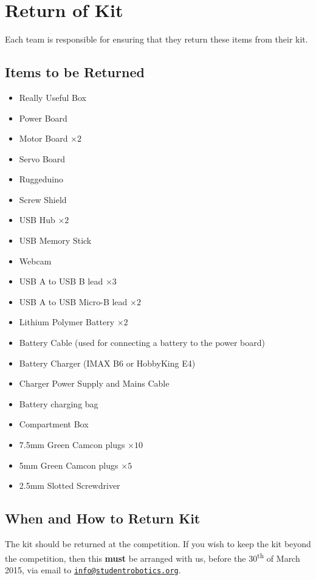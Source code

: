 \section {Return of Kit}
\label{sec:kit-return}

Each team is responsible for ensuring that they return these items from their kit.

\subsection {Items to be Returned}

\begin{itemize}
 \setlength{\itemsep}{0.3em}
 \item Really Useful Box

 \item Power Board
 \item Motor Board $\times 2$
 \item Servo Board
 \item Ruggeduino
 \item Screw Shield

 \item USB Hub $\times 2$
 \item USB Memory Stick
 \item Webcam
 \item USB A to USB B lead $\times 3$
 \item USB A to USB Micro-B lead $\times 2$

 \item Lithium Polymer Battery $\times 2$
 \item Battery Cable (used for connecting a battery to the power board)
 \item Battery Charger (IMAX B6 or HobbyKing E4)
 \item Charger Power Supply and Mains Cable
 \item Battery charging bag

 \item Compartment Box
 \item 7.5mm Green Camcon plugs $\times 10$
 \item 5mm Green Camcon plugs $\times 5$
 \item 2.5mm Slotted Screwdriver
\end{itemize}

\subsection {When and How to Return Kit}

The kit should be returned at the competition.
If you wish to keep the kit beyond the competition, then this \textbf{must} be arranged with us,
 before the 30\textsuperscript{th} of March 2015, via email to \href{mailto:info@studentrobotics.org}{\nolinkurl{info@studentrobotics.org}}.
